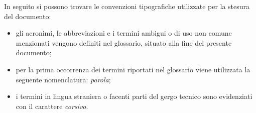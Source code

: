 In seguito si possono trovare le convenzioni tipografiche utilizzate per la stesura del documento:
\begin{itemize}
	\item gli acronimi, le abbreviazioni e i termini ambigui o di uso non comune menzionati vengono definiti nel glossario, situato alla fine del presente documento;
	\item per la prima occorrenza dei termini riportati nel glossario viene utilizzata la seguente nomenclatura: \textit{parola}\glox\gloxspacing;
	\item i termini in lingua straniera o facenti parti del gergo tecnico sono evidenziati con il carattere \textit{corsivo}.
\end{itemize}

\newpage